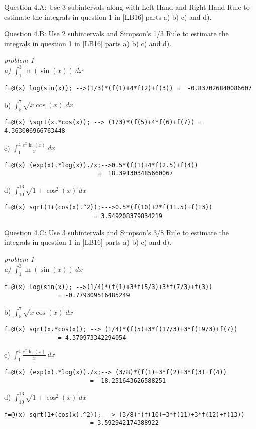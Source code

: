 \documentclass{article}
\renewcommand{\cite}[1]{[#1]}
\begin{document}
\par \medskip \noindent
%
Question 4.A: Use 3 subintervals along with Left Hand and Right Hand Rule to estimate the integrals in question 1 in \cite{LB16} parts a) b) c) and d). 
\par \medskip \noindent
%
Question 4.B: Use 2 subintervals and Simpson's 1/3 Rule to estimate the integrals in question 1 in \cite{LB16} parts a) b) c) and d). 
{\it \color{teal} problem 1 \\
a) $\int_1^3 \ln (\sin(x))\ dx$ \begin{verbatim}
f=@(x) log(sin(x)); -->(1/3)*(f(1)+4*f(2)+f(3)) =  -0.837026840086607
\end{verbatim}
b) $\int_5^7 \sqrt{x\cos(x)} \ dx$ \begin{verbatim}
f=@(x) \sqrt(x.*cos(x)); --> (1/3)*(f(5)+4*f(6)+f(7)) = 4.363006966763448
\end{verbatim}
c) $\int_1^4 \frac {e^x \ln(x)}x \ dx$\begin{verbatim}
f=@(x) (exp(x).*log(x))./x;-->0.5*(f(1)+4*f(2.5)+f(4)) 
                          =  18.391303485660067  
\end{verbatim}
d) $\int_{10}^{13} \sqrt{1+\cos ^2(x)} \ dx$ \begin{verbatim}
f=@(x) sqrt(1+(cos(x).^2));--->0.5*(f(10)+2*f(11.5)+f(13))
                         = 3.549208379834219
\end{verbatim}}
\medskip \par \noindent
%
Question 4.C: Use 3 subintervals and Simpson's 3/8 Rule to estimate the integrals in question 1 in \cite{LB16} parts a) b) c) and d). 
{\it \color{teal} problem 1 \\
a) $\int_1^3 \ln (\sin(x))\ dx$ \begin{verbatim}
f=@(x) log(sin(x)); -->(1/4)*(f(1)+3*f(5/3)+3*f(7/3)+f(3)) 
               = -0.779309516485249
\end{verbatim}
b) $\int_5^7 \sqrt{x\cos(x)} \ dx$ \begin{verbatim}
f=@(x) sqrt(x.*cos(x)); --> (1/4)*(f(5)+3*f(17/3)+3*f(19/3)+f(7)) 
               = 4.370973342294054 \end{verbatim}
c) $\int_1^4 \frac {e^x \ln(x)}x \ dx$\begin{verbatim}
f=@(x) (exp(x).*log(x))./x;--> (3/8)*(f(1)+3*f(2)+3*f(3)+f(4)) 
                        =  18.251643626588251 
\end{verbatim}
d) $\int_{10}^{13} \sqrt{1+\cos ^2(x)} \ dx$ \begin{verbatim}
f=@(x) sqrt(1+(cos(x).^2));---> (3/8)*(f(10)+3*f(11)+3*f(12)+f(13))
                        = 3.592942174388922
\end{verbatim}}
\end{document}
